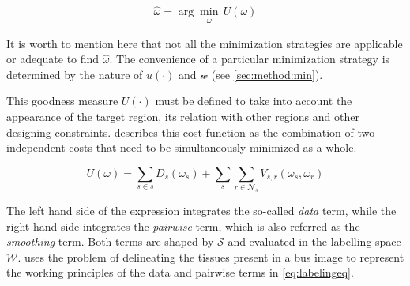 \begin{equation}
\hat{\omega} = \arg \min_{\substack{\omega}} \,U(\omega)
\label{eq:costMin}
\end{equation}

It is worth to mention here that not all the minimization strategies are applicable or adequate to find $\hat{\omega}$.
The convenience of a particular minimization strategy is determined by the nature of $u(\cdot)$ and $\mathcal{w}$ (see \cref{sec:method:min}).

This goodness measure $U(\cdot)$ must be defined to take into account the appearance of the target region, its relation with other regions and other designing constraints.
 describes this cost function as the combination of two independent costs that need to be simultaneously minimized as a whole.

\begin{equation}
  U(\omega) = \sum_{s\in s} D_s(\omega_s) + \sum_{s}\sum_{r \in \mathcal{N}_{s}} V_{s,r}(\omega_s,\omega_r)
  \label{eq:labelingeq}
\end{equation}

The left hand side of the expression integrates the so-called \emph{data} term, while the right hand side integrates the \emph{pairwise} term, which is also referred as the \emph{smoothing} term.
Both terms are shaped by $\mathcal{S}$ and evaluated in the labelling space $\mathcal{W}$.
 uses the problem of delineating the tissues present in a \ac{bus} image to represent the working principles of the data and pairwise terms in \cref{eq:labelingeq}.

